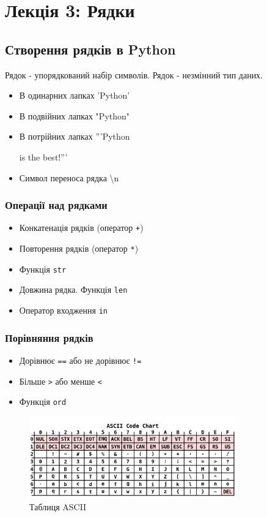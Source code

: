 \section{Лекція 3: Рядки}
\subsection{Створення рядків в Python} 
\begin{frame}
Рядок - упорядкований набір символів. Рядок - незмінний тип даних.
\begin{itemize}
  \item В одинарних лапках 'Python'
  \item В подвійних лапках "Python"
  \item 
  В потрійних лапках '''Python
  
  is the best!'''
  \item Символ переноса рядка \textbackslash n
 \end{itemize}

\end{frame}

\begin{frame}
\frametitle{Операції над рядками}
\begin{itemize}
  \item Конкатенація рядків (оператор \texttt{+})
  \item Повторення рядків (оператор \texttt{*})
  \item Функція \texttt{str}
  \item Довжина рядка. Функція \texttt{len}
  \item Оператор входження \texttt{in}
 \end{itemize}

\end{frame}

\begin{frame}
\frametitle{Порівняння рядків}
\begin{itemize}
  \item Дорівнює \texttt{==} або не дорівнює \texttt{!=}
  \item Більше \texttt{>} або менше \texttt{<}
  \item Функція \texttt{ord}
\end{itemize}
\begin{figure}
\begin{center}
 \includegraphics[width=0.8\textwidth]{pictures/ASCII-Table.png}
\caption{Таблиця ASCII}
\label{ASCII-Table} 
\end{center}
\end{figure}
\end{frame}

